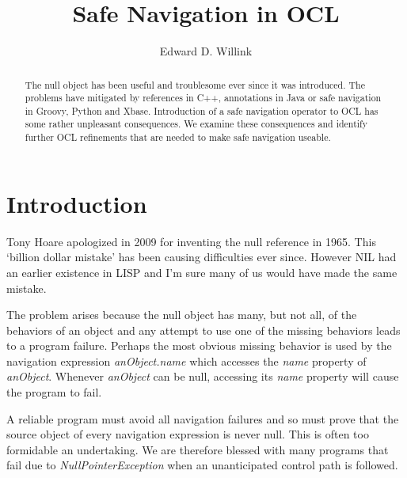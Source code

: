 \documentclass{llncs}
\begin{document}
%
\mainmatter              %
%
\title{Safe Navigation in OCL}
%
%
\author{Edward D. Willink}
%
%
%


\maketitle              %

\begin{abstract}
The null object has been useful and troublesome ever since it was introduced.
The problems have mitigated by references in C++, annotations in Java or safe navigation in Groovy, Python and Xbase.
Introduction of a safe navigation operator to OCL has some rather unpleasant consequences. We examine these
consequences and identify further OCL refinements that are needed to make safe navigation useable.

\end{abstract}
%
\section{Introduction}
%
Tony Hoare apologized in 2009\cite{Hoare-mistake} for inventing the null reference in 1965. This `billion dollar mistake' has been causing difficulties ever since. However NIL had an earlier existence in LISP and I'm sure many of us would have made the same mistake.

The problem arises because the null object has many, but not all, of the behaviors of an object and any attempt to use one of the missing behaviors leads to a program failure. Perhaps the most obvious missing behavior is used by the navigation expression \emph{anObject.name} which accesses the \emph{name} property of \emph{anObject}. Whenever \emph{anObject} can be null, accessing its \emph{name} property will cause the program to fail.

A reliable program must avoid all navigation failures and so must prove that the source object of every navigation expression is never null. This is often too formidable an undertaking. We are therefore blessed with many programs that fail due to \emph{NullPointerException} when an unanticipated control path is followed.
\end{document}
